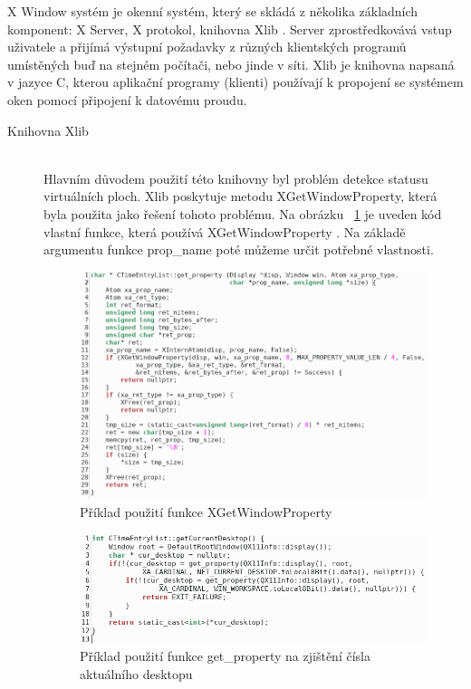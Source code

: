 \documentclass[thesis=B,czech]{FITthesis}[2012/06/26]
\begin{document}
X Window systém je okenní systém, který se skládá z několika základních komponent: X Server, X protokol, knihovna Xlib \cite{xlib_d}. Server zprostředkovává vstup uživatele a přijímá výstupní požadavky z různých klientských programů umístěných buď na stejném počítači, nebo jinde v síti. Xlib je knihovna napsaná v jazyce C, kterou aplikační programy (klienti) používají k propojení se systémem oken pomocí připojení k datovému proudu. 
\begin{description}
	\item[Knihovna Xlib]\hspace*{\fill} \\
	Hlavním důvodem použití této knihovny byl problém detekce statusu virtuálních ploch. Xlib poskytuje metodu XGetWindowProperty, která byla použita jako řešení tohoto problému. Na obrázku ~\ref{fig:get_property} je uveden kód vlastní funkce, která používá XGetWindowProperty \cite{xlib}. Na základě argumentu funkce prop\_name poté můžeme určit potřebné vlastnosti. 
	

 \begin{figure}[h]\centering
	\includegraphics[width=1\textwidth]{get_property_code.png}
	\caption[Příklad použití funkce XGetWindowProperty]{Příklad použití funkce XGetWindowProperty}\label{fig:get_property}
\end{figure}

 \begin{figure}[h]\centering
	\includegraphics[width=1\textwidth]{get_cur_disp.png}
	\caption[Příklad použití funkce get\_property na zjištění čísla aktuálního desktopu]{Příklad použití funkce get\_property na zjištění čísla aktuálního desktopu}\label{fig:get_cur_disp}
\end{figure}


\end{description}
\end{document}
